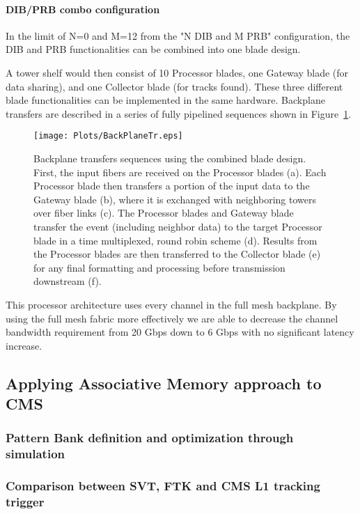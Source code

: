 \paragraph{DIB/PRB combo configuration}

\noindent In the limit of N=0 and M=12 from the "N DIB and M PRB" configuration, the DIB and PRB functionalities can be combined into one blade design.



\noindent A tower shelf would then consist of 10 Processor blades, one Gateway blade (for data sharing), and one Collector blade (for tracks found). These three different blade functionalities can be implemented in the same hardware. Backplane transfers are described in a series of fully pipelined sequences shown in Figure~\ref{fig:BackPlaneTr}.

\begin{figure}[ht!]
\centering
\texttt{[image: Plots/BackPlaneTr.eps]}
\caption{Backplane transfers sequences using the combined blade design. First, the input fibers are received on the Processor blades (a).  Each Processor blade then transfers a portion of the input data to the Gateway blade (b), where it is exchanged with neighboring towers over fiber links (c).  The Processor blades and Gateway blade transfer the event (including neighbor data) to the target Processor blade in a time multiplexed, round robin scheme (d).   Results from the Processor blades are then transferred to the Collector blade (e) for any final formatting and processing before transmission downstream (f).}
\label{fig:BackPlaneTr}
\end{figure}
 

\noindent This processor architecture uses every channel in the full mesh backplane.  By using the full mesh fabric more effectively we are able to decrease the channel bandwidth requirement from 20 Gbps down to 6 Gbps with no significant latency increase. 



\subsection{Applying Associative Memory approach to CMS }



\subsubsection{Pattern Bank definition and optimization through simulation }


\subsubsection{Comparison between SVT, FTK and CMS L1 tracking trigger }







